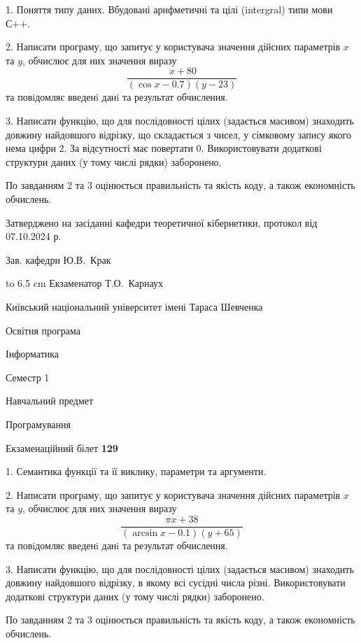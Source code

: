 \documentclass[12pt, ukrainian]{article}
\begin{document}
{%
1. Поняття типу даних. Вбудовані арифметичні та цілі (intergral) типи мови С++.%
\par
2. Написати програму, що запитує у користувача значення дійсних параметрів $x$ та $y$, обчислює для них значення виразу 
$$\frac{\ x + 80}{(\cos x - 0.7) (y - 23)}$$ 
та повiдомляє введенi данi та результат обчислення.

\par
3. Написати функцію, що для послідовності цілих (задається масивом) знаходить довжину найдовшого відрізку, що складається з чисел, у сімковому запису якого нема цифри 2. За відсутності має повертати $0$. Використовувати додаткові структури даних (у тому числі рядки) заборонено.

По завданням 2 та 3 оцінюється правильність та якість коду, а також економність обчислень.

}
{\smallskip\smallskip \begin {scriptsize} Затверджено на засіданні кафедри теоретичної кібернетики, протокол   від   07.10.2024 р.\par\smallskip\smallskip\smallskip\smallskip
{\parbox {6.5 cm} {Зав. кафедри \dotfill Ю.В.~Крак}}\hspace {0.7cm} {\hbox to 6.5 cm { Екзаменатор \dotfill Т.О.~Карнаух}} \end{scriptsize}}
\vspace{0.9cm}
{{\begin {scriptsize}\par
{ \center  Київський національний університет імені Тараса Шевченка \par}
{\parbox {5 cm}{Освітня програма \hfill}{\parbox {7 cm}{Інформатика\hfill}}\parbox {6 cm}{\hfill Семестр 1}}\par
{\parbox {5 cm} {Навчальний предмет \hfill}\parbox {7 cm}{Програмування \hfill}\parbox {6cm}{\hfill}\par}\vspace{-15pt} \end{scriptsize}}{\center Екзаменаційний білет \No \textbf { 129 }\par}}
{%
1. Семантика функції та її виклику, параметри та аргументи.%
\par
2. Написати програму, що запитує у користувача значення дійсних параметрів $x$ та $y$, обчислює для них значення виразу 
$$\frac{\pi x + 38}{(\arcsin x - 0.1) (y + 65)}$$ 
та повiдомляє введенi данi та результат обчислення.

\par
3. Написати функцію, що для послідовності цілих (задається масивом) знаходить довжину найдовшого відрізку, в якому всі сусідні числа різні. Використовувати додаткові структури даних (у тому числі рядки) заборонено.

По завданням 2 та 3 оцінюється правильність та якість коду, а також економність обчислень.

}
\end{document}

